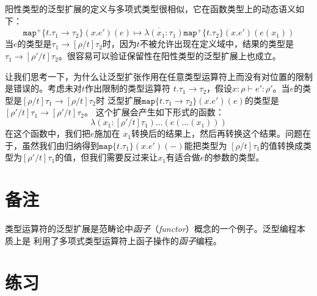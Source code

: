 阳性类型的泛型扩展的定义与多项式类型很相似，它在函数类型上的动态语义如下：
\begin{equation}\label{eq:positive-type-dynamics}
\overline{\texttt{map}^+\{t.\tau_1\rightarrow\tau_2\}(x.e')(e)\mapsto
\lambda(x_1:\tau_1)\texttt{map}^+\{t.\tau_2\}(x.e')(e(x_1))}
\end{equation}
当$e$的类型是$\tau_1\rightarrow[\rho/t]\tau_2$时，因为$t$不被允许出现在定义域中，结果的类型是
$\tau_1\rightarrow[\rho'/t]\tau_2$。很容易可以验证保留性在阳性类型的泛型扩展上也成立。

让我们思考一下，为什么让泛型扩张作用在任意类型运算符上而没有对位置的限制是错误的。考虑未对$t$作出限制的类型运算符
$t.\tau_1\rightarrow\tau_2$，假设$x:\rho\vdash e':\rho'$。当$e$的类型是$[\rho/t]\tau_1\rightarrow[\rho/t]\tau_2$时
泛型扩展$\texttt{map} \{t.\tau_1\rightarrow\tau_2 \} (x.e')(e)$的类型是$[\rho'/t]\tau_1\rightarrow[\rho'/t]\tau_2$。
这个扩展会产生如下形式的函数：$$\lambda(x_1:[\rho'/t]\tau_1)\dots(e(\dots(x_1)))$$在这个函数中，我们把$e$施加在
$x_1$转换后的结果上，然后再转换这个结果。问题在于，虽然我们由归纳得到$\texttt{map}\{t.\tau_1\}(x.e')(-)$能把类型为
$[\rho/t]\tau_1$的值转换成类型为$[\rho'/t]\tau_1$的值，但我们需要反过来让$x_1$有适合做$e$的参数的类型。

\section{备注}

\noindent 类型运算符的泛型扩展是范畴论中\textit{函子}（\textit{functor}）概念的一个例子。泛型编程本质上是
利用了多项式类型运算符上函子操作的\textit{函子}编程。

\section*{练习}

